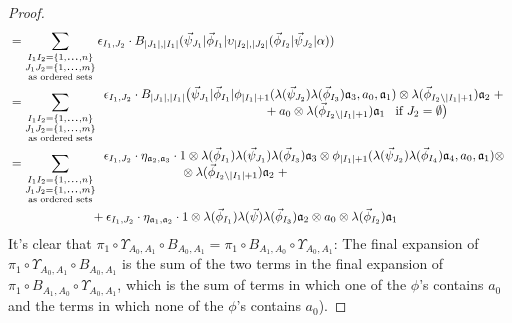 \begin{proof}
\begin{align*}
&=
\sum \limits_{\substack{
  I_1I_2 = \{1,\smdots,n\}\\
  J_1J_2 = \{1,\smdots,m\}\\
  \textrm{as ordered sets}}}
\epsilon_{I_1,J_2} \cdot
B_{|J_1|, |I_1|} (\vec{\psi}_{J_1} | \vec{\phi}_{I_1} | 
  \upsilon_{|I_2|, |J_2|} (\vec{\phi}_{I_2} | \vec{\psi}_{J_2} | \alpha)) \\
&= 
\sum \limits_{\substack{
  I_1I_2 = \{1,\smdots,n\}\\
  J_1J_2 = \{1,\smdots,m\}\\
  \textrm{as ordered sets}}}
\begin{array}{l}
\epsilon_{I_1,J_2} \cdot
B_{|J_1|, |I_1|} \big(\vec{\psi}_{J_1} | \vec{\phi}_{I_1} | \phi_{|I_1|+1} (
  \lambda(\vec{\psi}_{J_2}) \lambda(\vec{\phi}_{I_3}) 
  \mathfrak{a}_3, a_0, \mathfrak{a}_1) \otimes 
  \lambda(\vec{\phi}_{I_2 \backslash |I_1| + 1}) 
  \mathfrak{a}_2 \; + \\
\hphantom{{}moveovermoveovermoveover{}} 
  + a_0 \otimes \lambda(\vec{\phi}_{I_2 \backslash |I_1| + 1}) 
  \mathfrak{a}_1 \; \; \; 
  \text{if }J_2 = \emptyset \big)
\end{array} \\
&= 
\sum \limits_{\substack{
  I_1I_2 = \{1,\smdots,n\}\\
  J_1J_2 = \{1,\smdots,m\}\\
  \textrm{as ordered sets}}}
\begin{array}{l}  
\epsilon_{I_1,J_2} \cdot  
\eta_{\mathfrak{a}_2,\mathfrak{a}_3} \cdot  
1 \otimes \lambda(\vec{\phi}_{I_1}) \lambda(\vec{\psi}_{J_1}) 
  \lambda(\vec{\phi}_{I_3}) \mathfrak{a}_3 \otimes 
  \phi_{|I_1|+1} (\lambda(\vec{\psi}_{J_2}) \lambda(\vec{\phi}_{I_4}) 
  \mathfrak{a}_4, a_0, \mathfrak{a}_1) \otimes \\
  \phantom{{}moveovermov{}}\otimes 
  \lambda(\vec{\phi}_{I_2 \backslash |I_1| + 1}) 
  \mathfrak{a}_2 \; + 
\end{array}\\
&\hphantom{{}moveovermove{}} 
  +\epsilon_{I_1,J_2} \cdot  
  \eta_{\mathfrak{a}_1,\mathfrak{a}_2} \cdot  
  1 \otimes \lambda(\vec{\phi}_{I_1}) \lambda(\vec{\psi}) 
  \lambda(\vec{\phi}_{I_3}) \mathfrak{a}_2 \otimes 
  a_0 \otimes \lambda(\vec{\phi}_{I_2}) \mathfrak{a}_1
\end{align*}
%
It's clear that $\pi_1 \circ \Upsilon_{A_0,A_1} 
\circ B_{A_0,A_1} =  \pi_1 \circ B_{A_1,A_0} 
\circ \Upsilon_{A_0,A_1}$: The final expansion of 
$\pi_1 \circ \Upsilon_{A_0,A_1} \circ B_{A_0,A_1}$ 
is the sum of the two terms in the final expansion 
of $\pi_1 \circ B_{A_1,A_0} \circ \Upsilon_{A_0,A_1}$, 
which is the sum of terms in which one of 
the $\phi$'s contains $a_0$ and the terms in which 
none of the $\phi$'s contains $a_0$).
\end{proof}